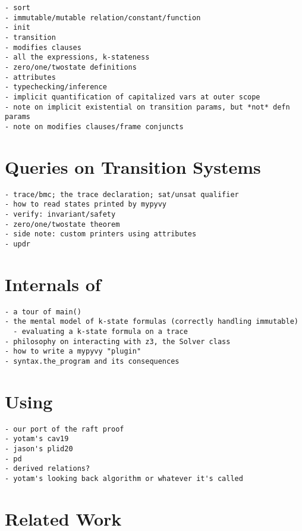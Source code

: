 \begin{verbatim}
- sort
- immutable/mutable relation/constant/function
- init
- transition
- modifies clauses
- all the expressions, k-stateness
- zero/one/twostate definitions
- attributes
- typechecking/inference
- implicit quantification of capitalized vars at outer scope
- note on implicit existential on transition params, but *not* defn params
- note on modifies clauses/frame conjuncts
\end{verbatim}

\section{Queries on Transition Systems}

\begin{verbatim}
- trace/bmc; the trace declaration; sat/unsat qualifier
- how to read states printed by mypyvy
- verify: invariant/safety
- zero/one/twostate theorem
- side note: custom printers using attributes
- updr
\end{verbatim}

\section{Internals of \mypyvy}

\begin{verbatim}
- a tour of main()
- the mental model of k-state formulas (correctly handling immutable)
  - evaluating a k-state formula on a trace
- philosophy on interacting with z3, the Solver class
- how to write a mypyvy "plugin"
- syntax.the_program and its consequences
\end{verbatim}

\section{Using \mypyvy}

\begin{verbatim}
- our port of the raft proof
- yotam's cav19
- jason's plid20
- pd
- derived relations?
- yotam's looking back algorithm or whatever it's called
\end{verbatim}

\section{Related Work}


